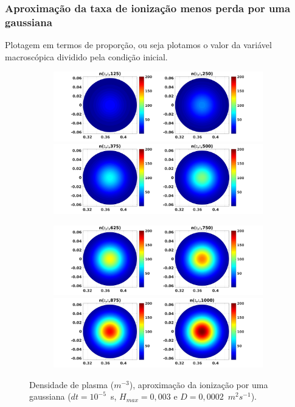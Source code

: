 \documentclass[aspectratio=169]{beamer}
\begin{document}
\begin{frame}
\frametitle{Aproximação da taxa de ionização menos perda por uma gaussiana}
Plotagem em termos de proporção, ou seja plotamos o valor da variável macroscópica dividido pela condição inicial.
\begin{figure}[H]
\begin{subfigure}{0.43\textwidth}
\includegraphics[scale=0.24]{../SImulacao_breakdown/PDE/ntod1B6.png}  
\includegraphics[scale=0.24]{../SImulacao_breakdown/PDE/ntod2B6.png} 
\end{subfigure}
\begin{subfigure}{0.43\textwidth}
\includegraphics[scale=0.24]{../SImulacao_breakdown/PDE/ntod3B6.png} 
\includegraphics[scale=0.24]{../SImulacao_breakdown/PDE/ntod4B6.png} 
\end{subfigure}
\caption{Densidade de plasma ($m^{-3}$), aproximação da ionização por uma gaussiana ($dt=10^{-5}$\ s, $H_{max} = 0,003$ e $D=0,0002$\ $m^2s^{-1}$).}
\label{densidadeB}
\end{figure}
\end{frame}
\end{document}
